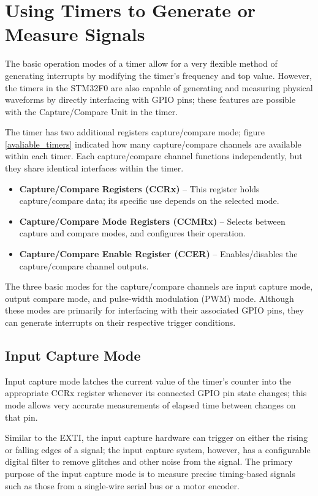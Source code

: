 \documentclass[openany,11pt,fleqn]{book} %
\begin{document}
\section{Using Timers to Generate or Measure Signals}
The basic operation modes of a timer allow for a very flexible method of generating interrupts by modifying the timer's frequency and top value. However, the timers in the STM32F0 are also capable of generating and measuring physical waveforms by directly interfacing with GPIO pins; these features are possible with the Capture/Compare Unit in the timer. 

The timer has two additional registers capture/compare mode; figure \ref{avaliable_timers} indicated how many capture/compare channels are available within each timer. Each capture/compare channel functions independently, but they share identical interfaces within the timer.  
\begin{itemize}
    \item \textbf{Capture/Compare Registers (CCRx)} -- This register holds capture/compare data; its specific use depends on the selected mode.
    \item \textbf{Capture/Compare Mode Registers (CCMRx)} -- Selects between capture and compare modes, and configures their operation.
    \item \textbf{Capture/Compare Enable Register (CCER)} -- Enables/disables the capture/compare channel outputs.
\end{itemize}

The three basic modes for the capture/compare channels are input capture mode, output compare mode, and pulse-width modulation (PWM) mode. Although these modes are primarily for interfacing with their associated GPIO pins, they can generate interrupts on their respective trigger conditions. 			
    
    \subsection{Input Capture Mode}
    Input capture mode latches the current value of the timer's counter into the appropriate CCRx register whenever its connected GPIO pin state changes; this mode allows very accurate measurements of elapsed time between changes on that pin. 
    
    Similar to the EXTI, the input capture hardware can trigger on either the rising or falling edges of a signal; the input capture system, however, has a configurable digital filter to remove glitches and other noise from the signal. The primary purpose of the input capture mode is to measure precise timing-based signals such as those from a single-wire serial bus or a motor encoder.  
\end{document}

